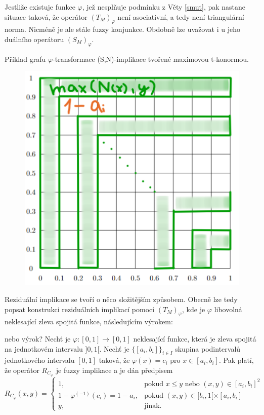\begin{corollary}
    Jestliže existuje funkce $\varphi$, jež nespl\v nuje podmínku z Věty \ref{smut}, pak nastane situace taková, že operátor $(T_M)_\varphi$ není asociativní, a tedy není triangulární norma. Nicméně je ale stále fuzzy konjunkce. Obdobně lze uvažovat i u jeho duálního operátoru $(S_M)_\varphi$.
\end{corollary}

\begin{graph}
    Příklad grafu $\varphi$-transformace (S,N)-implikace tvořené maximovou t-konormou.
    \begin{figure}[H]
                \hspace{-1cm}
                \includegraphics[scale=0.6]{template-fig/implikace.pdf}
                \centering
            \end{figure}
\end{graph}

Reziduální implikace se tvoří o něco složitějším zp\r usobem. Obecně lze tedy popsat konstrukci reziduálních implikací pomocí $\left(T_M\right)_\varphi$, kde je $\varphi$ libovolná neklesající zleva spojitá funkce, následujícím výrokem:

\begin{sentence}
    {\color{blue} nebo výrok?}
    Nech\v t je $\varphi:[0,1]\rightarrow [0,1]$
neklesající funkce, která je zleva spojitá na jednotkovém intervalu $]0,1[$.
Nech\v t je $\{[a_i,b_i]\}_{i\in I}$ skupina podinterval\r u jednotkového intervalu $[0,1]$ taková, že $\varphi(x)=c_i$ pro $x\in
[a_i,b_i]$.
Pak platí, že operátor $R_{C_{\varphi}}$ je fuzzy implikace a je dán předpisem
$$ R_{C_{\varphi}}(x,y) = \begin{cases} 1, & \mbox{pokud } x\leq y \mbox{ nebo } (x,y) \in [a_i,b_i]^2\\
1-\varphi^{(-1)}(c_i)=1-a_i, &\mbox {pokud }
(x,y)\in [b_i,1[\times[a_i,b_i]
\\ y, &\mbox {jinak.}
\end{cases} $$
\end{sentence}

